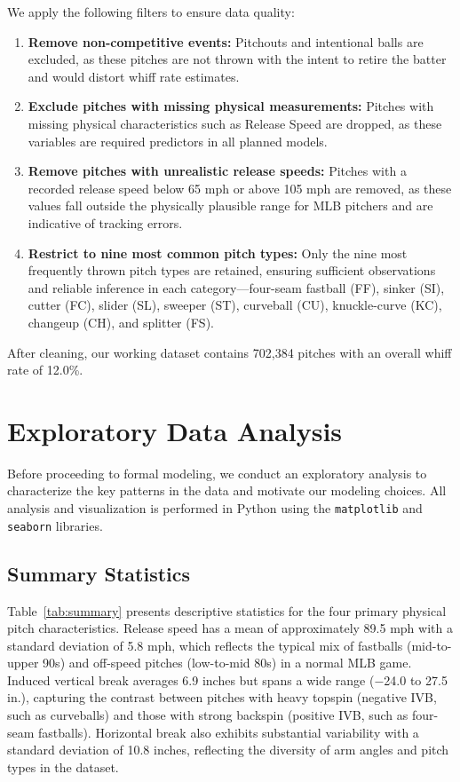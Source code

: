\documentclass[11pt]{article}
\newcommand{\totalPitches}{702{,}384}    %
\newcommand{\overallWhiff}{12.0}         %
\begin{document}
We apply the following filters to ensure data quality:
\begin{enumerate}[nosep]
    \item \textbf{Remove non-competitive events:} Pitchouts and intentional balls are excluded, as these pitches are not thrown with the intent to retire the batter and would distort whiff rate estimates.
    \item \textbf{Exclude pitches with missing physical measurements:} Pitches with missing physical characteristics such as Release Speed are dropped, as these variables are required predictors in all planned models. 
    \item \textbf{Remove pitches with unrealistic release speeds:} Pitches with a recorded release speed below 65 mph or above 105 mph are removed, as these values fall outside the physically plausible range for MLB pitchers and are indicative of tracking errors.
    \item \textbf{Restrict to nine most common pitch types:} Only the nine most frequently thrown pitch types are retained, ensuring sufficient observations and reliable inference in each category---four-seam fastball (FF), sinker (SI), cutter (FC), slider (SL), sweeper (ST), curveball (CU), knuckle-curve (KC), changeup (CH), and splitter (FS).
\end{enumerate}
After cleaning, our working dataset contains \totalPitches{} pitches with an overall whiff rate of \overallWhiff\%.

\section{Exploratory Data Analysis}

Before proceeding to formal modeling, we conduct an exploratory analysis to characterize the key patterns in the data and motivate our modeling choices.
All analysis and visualization is performed in Python using the \texttt{matplotlib} \citep{matplotlib2007} and \texttt{seaborn} \citep{seaborn2021} libraries.

\subsection{Summary Statistics}

Table~\ref{tab:summary} presents descriptive statistics for the four primary physical pitch characteristics.
Release speed has a mean of approximately 89.5 mph with a standard deviation of 5.8 mph, which reflects the typical mix of fastballs (mid-to-upper 90s) and off-speed pitches (low-to-mid 80s) in a normal MLB game.
Induced vertical break averages 6.9 inches but spans a wide range ($-$24.0 to 27.5 in.), capturing the contrast between pitches with heavy topspin (negative IVB, such as curveballs) and those with strong backspin (positive IVB, such as four-seam fastballs).
Horizontal break also exhibits substantial variability with a standard deviation of 10.8 inches, reflecting the diversity of arm angles and pitch types in the dataset.
\end{document}
